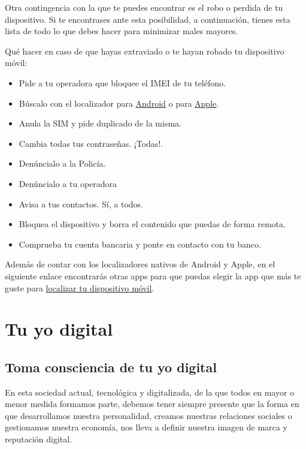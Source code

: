 \documentclass[
  spanish,
  a4paper,
  openany]{book}
\begin{document}
Otra contingencia con la que te puedes encontrar es el robo o perdida de tu dispositivo. Si te encontrases ante esta posibilidad, a continuación, tienes esta lista de todo lo que debes hacer para minimizar males mayores.

Qué hacer en caso de que hayas extraviado o te hayan robado tu dispositivo móvil:

\begin{itemize}
\item
  Pide a tu operadora que bloquee el IMEI de tu teléfono.
\item
  Búscalo con el localizador para \href{https://myaccount.google.com/intro/find-your-phone?hl=es-ES}{Android} o para \href{https://www.apple.com/es/icloud/find-my/}{Apple}.
\item
  Anula la SIM y pide duplicado de la misma.
\item
  Cambia todas tus contraseñas. ¡Todas!.
\item
  Denúncialo a la Policía.
\item
  Denúncialo a tu operadora
\item
  Avisa a tus contactos. Sí, a todos.
\item
  Bloquea el dispositivo y borra el contenido que puedas de forma remota.
\item
  Comprueba tu cuenta bancaria y ponte en contacto con tu banco.
\end{itemize}

Además de contar con los localizadores nativos de Android y Apple, en el siguiente enlace encontrarás otras apps para que puedas elegir la app que más te guste para \href{https://www.osi.es/es/herramientas-gratuitas?herramienta_selec\%5B0\%5D=122}{localizar tu dispositivo móvil}.

\hypertarget{tu-yo-digital}{%
\chapter{Tu yo digital}\label{tu-yo-digital}}

\hypertarget{toma-consciencia-de-tu-yo-digital}{%
\section{Toma consciencia de tu yo digital}\label{toma-consciencia-de-tu-yo-digital}}

En esta sociedad actual, tecnológica y digitalizada, de la que todos en mayor o menor medida formamos parte, debemos tener siempre presente que la forma en que desarrollamos nuestra personalidad, creamos nuestras relaciones sociales o gestionamos nuestra economía, nos lleva a definir nuestra imagen de marca y reputación digital.
\end{document}
